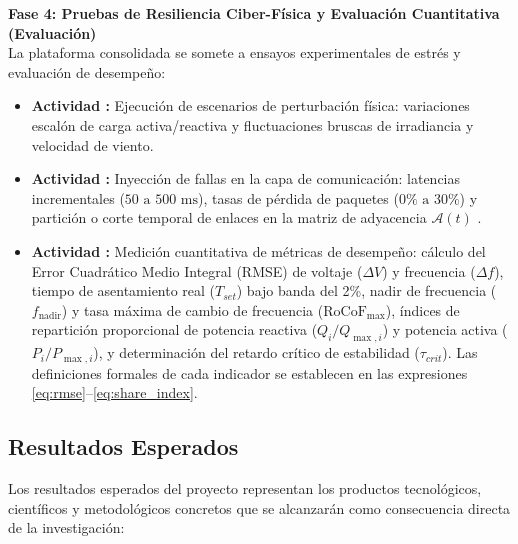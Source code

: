 \textbf{Fase 4: Pruebas de Resiliencia Ciber-Física y Evaluación Cuantitativa (Evaluación)}\\
La plataforma consolidada se somete a ensayos experimentales de estrés y evaluación de desempeño:
\begin{itemize}
    \item \textbf{Actividad :} Ejecución de escenarios de perturbación física: variaciones escalón de carga activa/reactiva y fluctuaciones bruscas de irradiancia y velocidad de viento.
    \item \textbf{Actividad :} Inyección de fallas en la capa de comunicación: latencias incrementales ($50\text{ a }500\text{ ms}$), tasas de pérdida de paquetes ($0\%\text{ a }30\%$) y partición o corte temporal de enlaces en la matriz de adyacencia $\mathcal{A}(t)$ \citep{Sowa2023, Olayanju2025ConsensusFreq}.
    \item \textbf{Actividad :} Medición cuantitativa de métricas de desempeño: cálculo del Error Cuadrático Medio Integral (RMSE) de voltaje ($\Delta V$) y frecuencia ($\Delta f$), tiempo de asentamiento real ($T_{set}$) bajo banda del 2\%, nadir de frecuencia ($f_{\text{nadir}}$) y tasa máxima de cambio de frecuencia ($\text{RoCoF}_{\max}$), índices de repartición proporcional de potencia reactiva ($Q_i/Q_{\max, i}$) y potencia activa ($P_i/P_{\max, i}$), y determinación del retardo crítico de estabilidad ($\tau_{crit}$). Las definiciones formales de cada indicador se establecen en las expresiones \eqref{eq:rmse}--\eqref{eq:share_index}.
\end{itemize}

\newpage
\subsection{Resultados Esperados}

Los resultados esperados del proyecto representan los productos tecnológicos, científicos y metodológicos concretos que se alcanzarán como consecuencia directa de la investigación:

